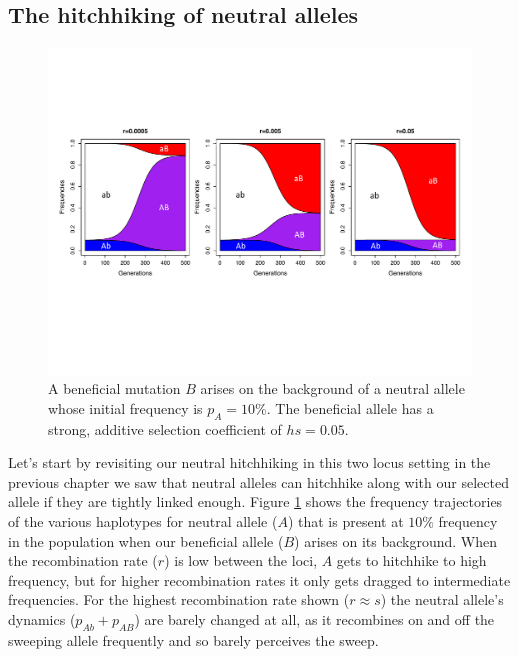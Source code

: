 \subsection{The hitchhiking of neutral alleles}
\begin{figure}
\begin{center}
  \includegraphics[width = 0.9 \textwidth]{figures/selection_recom_interaction/Neutral_Hitchhiking_labeled.pdf}
\end{center}
\caption{A beneficial mutation $B$ arises on the background of a neutral allele whose initial frequency is $p_A=10\%$. The beneficial allele has a strong, additive selection coefficient of $hs=0.05$.} \label{fig:Neutral_HH}  %
\end{figure}
Let's start by revisiting our neutral hitchhiking in this two locus setting in the previous chapter we saw that neutral alleles can hitchhike along with our selected allele if they are tightly linked enough. Figure \ref{fig:Neutral_HH}  shows the frequency trajectories of the various haplotypes for neutral allele ($A$) that is present at $10\%$ frequency in the population when our beneficial allele ($B$) arises on its background. When the recombination rate ($r$) is low between the loci, $A$ gets to hitchhike to high frequency, but for higher recombination rates it only gets dragged to intermediate frequencies. For the highest recombination rate shown ($r \approx s$) the neutral allele's dynamics ($p_{Ab}+p_{AB}$) are barely changed at all, as it recombines on and off the sweeping allele frequently and so barely perceives the sweep. 


